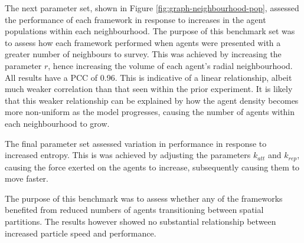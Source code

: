   The next parameter set, shown in Figure \ref{fig:graph-neighbourhood-pop}, assessed the performance of each framework in response to increases in the agent populations within each neighbourhood. The purpose of this benchmark set was to assess how each framework performed when agents were presented with a greater number of neighbours to survey. This was achieved by increasing the parameter $r$, hence increasing the volume of each agent's radial neighbourhood. All results have a PCC \cite{PCC} of 0.96. This is indicative of a linear relationship, albeit much weaker correlation than that seen within the prior experiment. It is likely that this weaker relationship can be explained by how the agent density becomes more non-uniform as the model progresses, causing the number of agents within each neighbourhood to grow.
  
  The final parameter set assessed variation in performance in response to increased entropy. This is was achieved by adjusting the parameters $k_{att}$ and $k_{rep}$, causing the force exerted on the agents to increase, subsequently causing them to move faster.
  
  The purpose of this benchmark was to assess whether any of the frameworks benefited from reduced numbers of agents transitioning between spatial partitions. The results however showed no substantial relationship between increased particle speed and performance.
